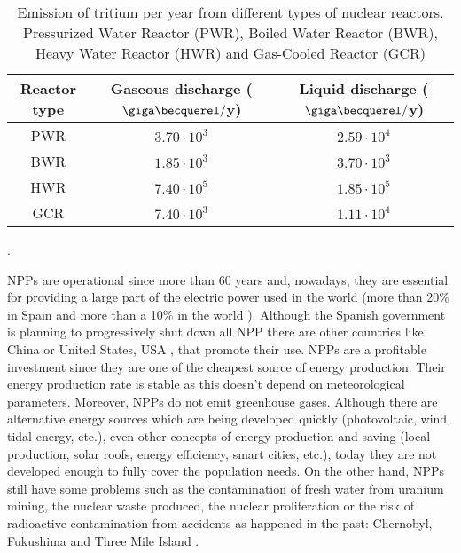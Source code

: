 \begin{table}[htbp]
\begin{center}
\begin{tabular}{|c|c|c|}
\hline
Reactor type & Gaseous discharge ($\giga\becquerel/$y) & Liquid discharge ($\giga\becquerel/$y) \\
\hline \hline \hline
PWR & $3.70\cdot 10^{3}$ & $2.59\cdot 10^{4}$ \\ \hline
BWR & $1.85\cdot 10^{3}$ & $3.70\cdot 10^{3}$ \\ \hline
HWR & $7.40\cdot 10^{5}$ & $1.85\cdot 10^{5}$ \\ \hline
GCR & $7.40\cdot 10^{3}$ & $1.11\cdot 10^{4}$ \\ \hline
\end{tabular}
\caption{Emission of tritium per year from different types of nuclear reactors. Pressurized Water Reactor (PWR), Boiled Water Reactor (BWR), Heavy Water Reactor (HWR) and Gas-Cooled Reactor (GCR) \cite{CommonEmissionTritium}}.
\label{tab:TritiumEmisionsNPPs}
\end{center}
\end{table} 

NPPs are operational since more than 60 years and, nowadays, they are essential for providing a large part of the electric power used in the world (more than 20\% in Spain \cite{PercentageEnergySpain} and more than a 10\% in the world \cite{PercentageEnergyWorld}). Although the Spanish government is planning to progressively shut down all NPP there are other countries like China \cite{60ReactorsChina} or United States, USA \cite{35MillionsUSA}, that promote their use. NPPs are a profitable investment since they are one of the cheapest source of energy production. Their energy production rate is stable as this doesn't depend on meteorological parameters. Moreover, NPPs do not emit greenhouse gases. Although there are alternative energy sources which are being developed quickly (photovoltaic, wind, tidal energy, etc.), even other concepts of energy production and saving (local production, solar roofs, energy efficiency, smart cities, etc.), today they are not developed enough to fully cover the population needs. On the other hand, NPPs still have some problems such as the contamination of fresh water from uranium mining, the nuclear waste produced, the nuclear proliferation or the risk of radioactive contamination from accidents as happened in the past: Chernobyl, Fukushima and Three Mile Island \cite{ThreeMileIsland}.

